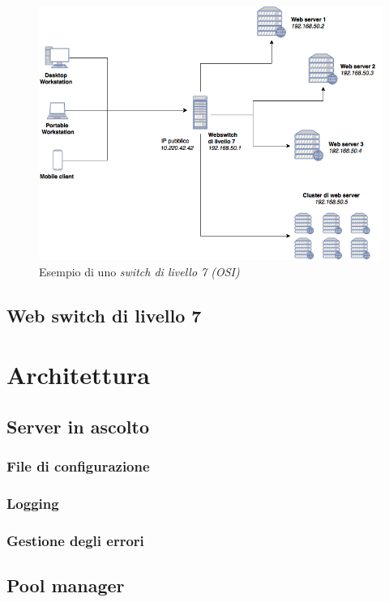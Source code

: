 \documentclass[italian]{tktltiki2}
\begin{document}
\begin{figure}
\centering
\includegraphics[width=\textwidth]{images/switch7}
\caption{Esempio di uno \emph{switch di livello 7 (OSI)}}
\end{figure}

\subsection{Web switch di livello 7}

\newpage
\section{Architettura}

\subsection{Server in ascolto}
\subsubsection{File di configurazione}
\label{sec:config}
\subsubsection{Logging}
\subsubsection{Gestione degli errori}

\subsection{Pool manager}
\end{document}
